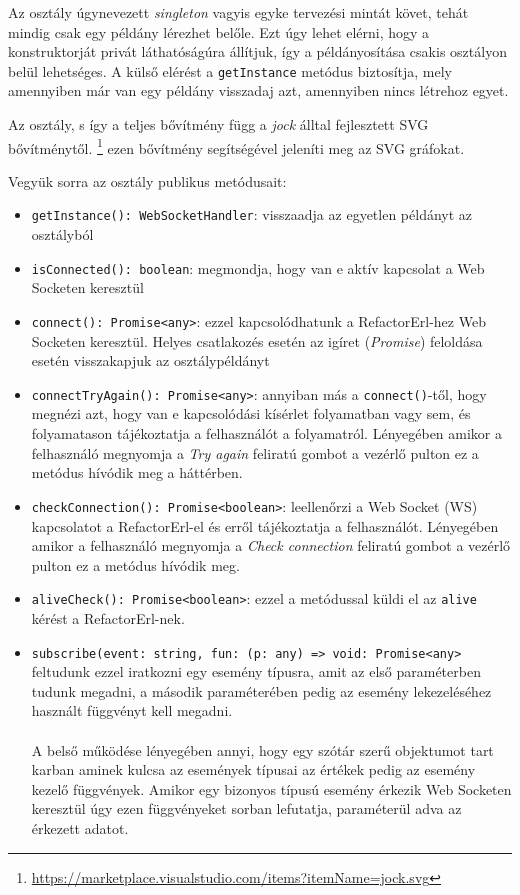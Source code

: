 Az osztály úgynevezett \textit{singleton} vagyis egyke tervezési mintát követ, tehát mindig csak egy példány lérezhet belőle. Ezt úgy lehet elérni, hogy a konstruktorját privát láthatóságúra állítjuk, így a példányosítása csakis osztályon belül lehetséges. A külső elérést a \lstinline{getInstance} metódus biztosítja, mely amennyiben már van egy példány visszadaj azt, amennyiben nincs létrehoz egyet.

Az osztály, s így a teljes bővítmény függ a \textit{jock} álltal fejlesztett SVG bővítménytől. \footnote{\url{https://marketplace.visualstudio.com/items?itemName=jock.svg}} ezen bővítmény segítségével jeleníti meg az SVG gráfokat.

\noindent Vegyük sorra az osztály publikus metódusait:

\begin{itemize}
    \item \lstinline{getInstance(): WebSocketHandler}: visszaadja az egyetlen példányt az osztályból 
    
    \item \lstinline{isConnected(): boolean}: megmondja, hogy van e aktív kapcsolat a Web Socketen keresztül
    
    \item \lstinline{connect(): Promise<any>}: ezzel kapcsolódhatunk a RefactorErl-hez Web Socketen keresztül. Helyes csatlakozés esetén az igíret (\textit{Promise}) feloldása esetén visszakapjuk az osztálypéldányt
    
    \item \lstinline{connectTryAgain(): Promise<any>}: annyiban más a \lstinline{connect()}-től, hogy megnézi azt, hogy van e kapcsolódási kísérlet folyamatban vagy sem, és folyamatason tájékoztatja a felhasználót a folyamatról. Lényegében amikor a felhasználó megnyomja a \textit{Try again} feliratú gombot a vezérlő pulton ez a metódus hívódik meg a háttérben.
    
    \item \lstinline{checkConnection(): Promise<boolean>}: leellenőrzi a Web Socket (WS) kapcsolatot a RefactorErl-el és erről tájékoztatja a felhasználót. Lényegében amikor a felhasználó megnyomja a \textit{Check connection} feliratú gombot a vezérlő pulton ez a metódus hívódik meg.
    
    \item \lstinline{aliveCheck(): Promise<boolean>}: ezzel a metódussal küldi el az \lstinline{alive} kérést a RefactorErl-nek.
    
    \item \lstinline{subscribe(event: string, fun: (p: any) => void: Promise<any>} feltudunk ezzel iratkozni egy esemény típusra, amit az első paraméterben tudunk megadni, a második paraméterében pedig az esemény lekezeléséhez használt függvényt kell megadni. \\ \\ A belső működése lényegében annyi, hogy egy szótár szerű objektumot tart karban aminek kulcsa az események típusai az értékek pedig az esemény kezelő függvények. Amikor egy bizonyos típusú esemény érkezik Web Socketen keresztül úgy ezen függvényeket sorban lefutatja, paraméterül adva az érkezett adatot.
    

\end{itemize}
